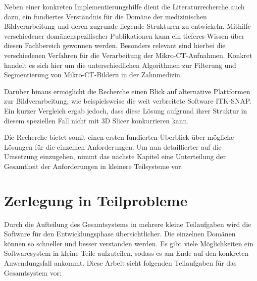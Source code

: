 Neben einer konkreten Implementierungshilfe dient die Literaturrecherche auch dazu,
ein fundiertes Verständnis für die Domäne der medizinischen Bildverarbeitung und
deren zugrunde liegende Strukturen zu entwickeln. Mithilfe verschiedener domänenspezifischer
Publikationen kann ein tieferes Wissen über diesen Fachbereich gewonnen werden.
Besonders relevant sind hierbei die verschiedenen Verfahren für die Verarbeitung
der Mikro-\ac{CT}-Aufnahmen. Konkret handelt es sich hier um die
unterschiedlichen Algorithmen zur Filterung und Segmentierung von Mikro-\ac{CT}-Bildern
in der Zahnmedizin.

Darüber hinaus ermöglicht die Recherche einen Blick auf alternative Plattformen zur
Bildverarbeitung, wie beispielsweise die weit verbreitete Software \ac{ITK-SNAP}.
Ein kurzer Vergleich ergab jedoch, dass diese Lösung aufgrund ihrer Struktur in diesem
speziellen Fall nicht mit 3D Slicer konkurrieren kann.

Die Recherche bietet somit einen ersten fundierten Überblick über mögliche Lösungen
für die einzelnen Anforderungen. Um nun detaillierter auf die Umsetzung
einzugehen, nimmt das nächste Kapitel eine Unterteilung der Gesamtheit der Anforderungen
in kleinere Teilsysteme vor.

\section{Zerlegung in Teilprobleme}
\label{sec_zerlegung_in_teilprobleme} Durch die Aufteilung des Gesamtsystems in mehrere
kleine Teilaufgaben wird die Software für den Entwicklungsphase übersichtlicher.
Die einzelnen Domänen können so schneller und besser verstanden werden. Es gibt viele
Möglichkeiten ein Softwaresystem in kleine Teile aufzuteilen, sodass es am Ende
auf den konkreten Anwendungsfall ankommt. Diese Arbeit sieht folgenden Teilaufgaben
für das Gesamtsystem vor:

